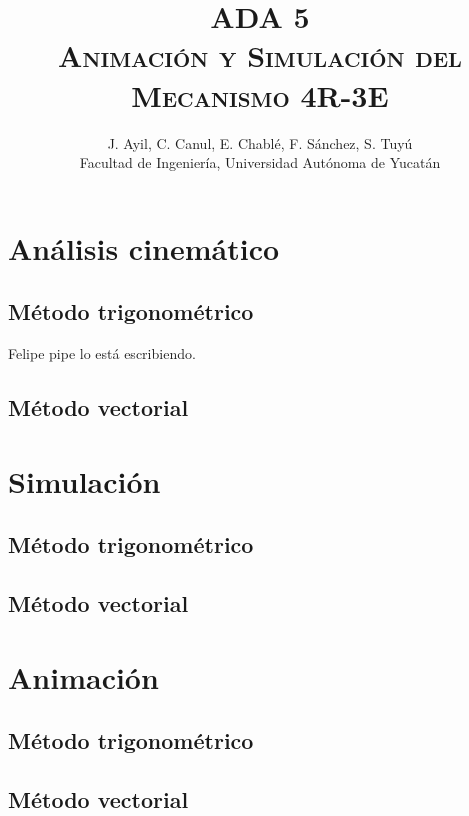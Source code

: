 \documentclass[12pt, final]{extarticle}
\title{ADA 5\\
\textsc{Animación y Simulación del Mecanismo 4R-3E}}
\author{J. Ayil, C. Canul, E. Chablé, F. Sánchez, S. Tuyú\\
{Facultad de Ingeniería, Universidad Autónoma de Yucatán}}
\date{}
\begin{document}
\maketitle

\begin{abstract}
    \blindtext
\end{abstract}

\section{Análisis cinemático}
\subsection{Método trigonométrico}
Felipe pipe lo está escribiendo.

\subsection{Método vectorial}

\newpage
\section{Simulación}
\subsection{Método trigonométrico}

\subsection{Método vectorial}


\newpage
\section{Animación}
\subsection{Método trigonométrico}

\subsection{Método vectorial}


\nocite{*}
\vfill


\end{document}

